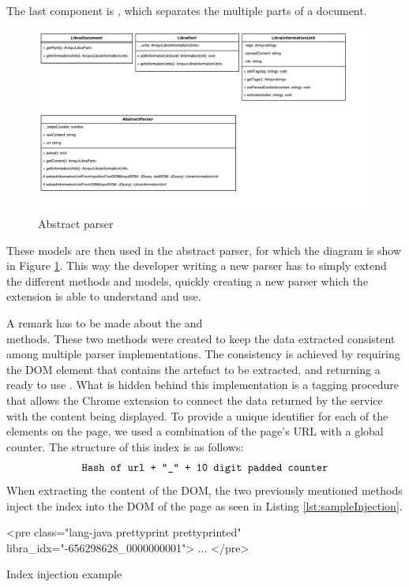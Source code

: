 The last component is , which separates the multiple parts of a document.



\begin{figure}[H]
\centering
\includegraphics[scale=0.5]{Figures/AbstractParserUML}
\caption{Abstract parser}
\label{fig:abstractParserDiagram}
\end{figure}

These models are then used in the abstract parser, for which the diagram is show in Figure \ref{fig:abstractParserDiagram}. This way the developer writing a new parser has to simply extend the different methods and models, quickly creating a new parser which the extension is able to understand and use. 

A remark has to be made about the  and \\ methods. These two methods were created to keep the data extracted consistent among multiple parser implementations. The consistency is achieved by requiring the DOM element that contains the artefact to be extracted, and returning a ready to use . What is hidden behind this implementation is a tagging procedure that allows the Chrome extension to connect the data returned by the service with the content being displayed. To provide a unique identifier for each of the elements on the page, we used a combination of the page's URL with a global counter. The structure of this index is as follows:
\[
\text{\texttt{Hash of url + "\_" + 10 digit padded counter}}
\]
When extracting the content of the DOM, the two previously mentioned methods inject the index into the DOM of the page as seen in Listing \ref{lst:sampleInjection}.
\begin{listing}[H]
\centering
\begin{htmlcode}
<pre class="lang-java prettyprint prettyprinted" libra_idx="-656298628_0000000001">
    ...
</pre>
\end{htmlcode}
\caption{Index injection example}
\label{lst:sampleInjection}
\end{listing}

